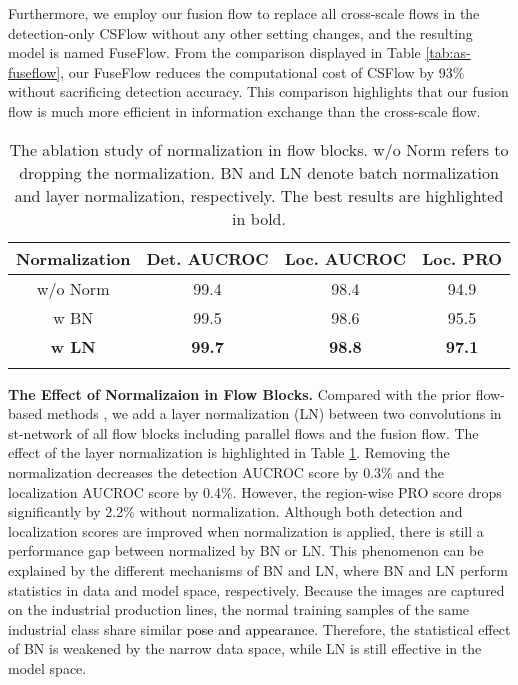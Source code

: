 \documentclass[lettersize,journal]{IEEEtran}
\newcommand{\myrule}{\specialrule{.1em}{.0ex}{.0ex}}
\newcommand{\roundb}[1]{\textcolor{black}{#1}}
\begin{document}
Furthermore, we employ our fusion flow to replace all cross-scale flows in the detection-only CSFlow \cite{rudolph2022csflow} without any other setting changes, and the resulting model is named FuseFlow. From the comparison displayed in Table \ref{tab:as-fuseflow}, our FuseFlow reduces the computational cost of CSFlow by 93\% without sacrificing detection accuracy. This comparison highlights that our fusion flow is much more efficient in information exchange than the cross-scale flow.

\begin{table}[b]
  \centering
  \caption{The ablation study of normalization in flow blocks. w/o Norm refers to dropping the normalization. BN and LN denote batch normalization and layer normalization, respectively. The best results are highlighted in bold.} \label{tab:as-normalization}
  \begin{tabular}{c|c|c|c}
  \myrule
  Normalization & Det. AUCROC    & Loc. AUCROC    & Loc. PRO      \\ \hline
  w/o Norm      & 99.4          & 98.4          & 94.9          \\ 
  w BN          & 99.5          & 98.6          & 95.5          \\ 
  \textbf{w LN}          & \textbf{99.7} & \textbf{98.8} & \textbf{97.1} \\ \myrule
  \end{tabular}
  \end{table}

\vspace{3pt}\textbf{The Effect of Normalizaion in Flow Blocks.}
Compared with the prior flow-based methods \cite{rudolph2022csflow,gudovskiy2022cflow,rudolph2021differnet}, we add a layer normalization (LN) between two  convolutions in st-network of all flow blocks including parallel flows and the fusion flow. The effect of the layer normalization is highlighted in Table \ref{tab:as-normalization}. Removing the normalization decreases the detection AUCROC score by 0.3\% and the localization AUCROC score by 0.4\%. However, the region-wise PRO score drops significantly by 2.2\% without normalization. Although both detection and localization scores are improved when normalization is applied, there is still a performance gap between normalized by BN or LN. This phenomenon can be explained by the different mechanisms of BN and LN, where BN and LN perform statistics in data and model space, respectively.
Because the images are captured on the industrial production lines, the normal training samples of the same industrial class share similar \roundb{pose and appearance}. Therefore, the statistical effect of BN is weakened by the narrow data space, while LN is still effective in the model space.
\end{document}
